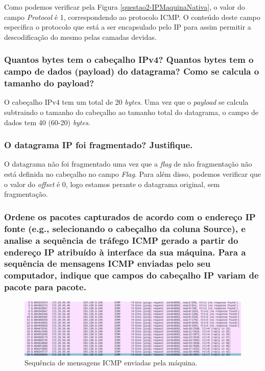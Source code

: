     \par Como podemos verificar pela Figura \ref{questao2-IPMaquinaNativa}, o valor do campo \textit{Protocol} é 1, correspondendo ao protocolo ICMP. O conteúdo deste campo especifica o protocolo que está a ser encapsulado pelo IP para assim permitir a descodificação do mesmo pelas camadas devidas. 



\subsubsection{Quantos bytes tem o cabeçalho IPv4? Quantos bytes tem o campo de dados (payload) do datagrama? Como se calcula o tamanho do payload?}

    \par O cabeçalho IPv4 tem um total de 20 \textit{bytes}. Uma vez que o \textit{payload} se calcula subtraindo o tamanho do cabeçalho ao tamanho total do datagrama, o campo de dados tem 40 (60-20) \textit{bytes}.


\subsubsection{O datagrama IP foi fragmentado? Justifique.}

    \par O datagrama não foi fragmentado uma vez que a \textit{flag} de não fragmentação não está definida no cabeçalho no campo \textit{Flag}. Para além disso, podemos verificar que o valor do \textit{offset} é 0, logo estamos perante o datagrama original, sem fragmentação.



\subsubsection{Ordene os pacotes capturados de acordo com o endereço IP fonte (e.g., selecionando o cabeçalho da coluna Source), e analise a sequência de tráfego ICMP gerado a partir do endereço IP atribuído à interface da sua máquina. Para a sequência de mensagens ICMP enviadas pelo seu computador, indique que campos do cabeçalho IP variam de pacote para pacote.}

    \begin{figure}[H]
    \centering
    \includegraphics[width=500pt]{images/ParteI/Questao2/questao2-ICMPdaMaquina.png}
    \caption{Sequência de mensagens ICMP enviadas pela máquina.} \label{questao2-SequenciaICMP-1}
    \end{figure}

